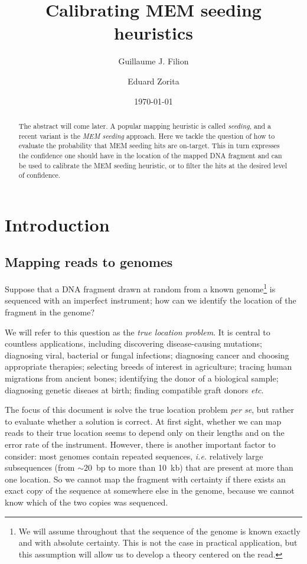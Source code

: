\documentclass{article}
\title{Calibrating MEM seeding heuristics}
\author[1,2]{Guillaume J. Filion}
\author[1,2]{Eduard Zorita}
\affil[1]{Genome Architecture, Gene Regulation, Stem Cells and Cancer
Programme, Center for Genomic Regulation (CRG), The Barcelona Institute of
Science and Technology, Dr. Aiguader 88, Barcelona 08003, Spain.}
\affil[2]{University Pompeu Fabra, Doctor Aiguader, 08003 Barcelona,
Spain.}
\date{\today}
\begin{document}
\maketitle

\begin{abstract}
The abstract will come later.
A popular mapping heuristic is called \emph{seeding}, and a recent variant
is the \emph{MEM seeding} approach. Here we tackle the question of how to
evaluate the probability that MEM seeding hits are on-target. This in turn
expresses the confidence one should have in the location of the mapped DNA
fragment and can be used to calibrate the MEM seeding heuristic, or to
filter the hits at the desired level of confidence.
\end{abstract}



\section{Introduction}

\subsection{Mapping reads to genomes}

Suppose that a DNA fragment drawn at random from a known
genome\footnote{We will assume throughout that the sequence of the genome
is known exactly and with absolute certainty. This is not the case in
practical application, but this assumption will allow us to develop a
theory centered on the read.} is sequenced with an imperfect instrument;
how can we identify the location of the fragment in the genome?

We will refer to this question as the \emph{true location problem}.
It is central to countless applications, including discovering
disease-causing mutations; diagnosing viral, bacterial or fungal
infections; diagnosing cancer and choosing appropriate therapies;
selecting breeds of interest in agriculture; tracing human migrations from
ancient bones; identifying the donor of a biological sample; diagnosing
genetic diseaes at birth; finding compatible graft donors \textit{etc}.

The focus of this document is solve the true location problem \textit{per
se}, but rather to evaluate whether a solution is correct. At first sight,
whether we can map reads to their true location seems to depend only on
their lengths and on the error rate of the instrument. However, there is
another important factor to consider: most genomes contain repeated
sequences, \textit{i.e.} relatively large subsequences (from $\sim20$~bp
to more than 10~kb) that are present at more than one location. So we
cannot map the fragment with certainty if there exists an exact copy of
the sequence at somewhere else in the genome, because we cannot know which
of the two copies was sequenced.
\end{document}
